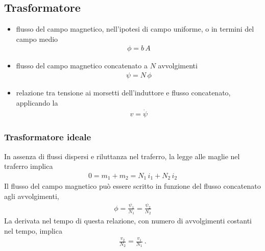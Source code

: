 \documentclass[letterpaper,10pt,english]{jupyterBook}
\begin{document}
\subsection{Trasformatore}
\label{\detokenize{ch/circuits-electromagnetic-transformer:trasformatore}}\label{\detokenize{ch/circuits-electromagnetic-transformer:classical-electromagnetism-circuits-electromagnetic-transformer}}\label{\detokenize{ch/circuits-electromagnetic-transformer::doc}}\begin{itemize}
\item {} 
\sphinxAtStartPar
flusso del campo magnetico, nell’ipotesi di campo uniforme, o in termini del campo medio
\begin{equation*}
\begin{split}\phi = b \, A\end{split}
\end{equation*}
\item {} 
\sphinxAtStartPar
flusso del campo magnetico concatenato a \(N\) avvolgimenti
\begin{equation*}
\begin{split}\psi = N \, \phi\end{split}
\end{equation*}
\item {} 
\sphinxAtStartPar
relazione tra tensione ai morsetti dell’induttore e flusso concatenato, applicando la {\hyperref[\detokenize{ch/circuits-electric-induction:classical-electromagnetism-circuits-electric-induction}]{}}
\begin{equation*}
\begin{split}v = \dot{\psi}\end{split}
\end{equation*}
\end{itemize}


\subsubsection{Trasformatore ideale}
\label{\detokenize{ch/circuits-electromagnetic-transformer:trasformatore-ideale}}
\sphinxAtStartPar
In assenza di flussi dispersi e riluttanza nel traferro, la legge alle maglie nel traferro implica
\begin{equation*}
\begin{split}0 = m_1 + m_2 = N_1 \, i_1 + N_2 \, i_2\end{split}
\end{equation*}
\sphinxAtStartPar
Il flusso del campo magnetico può essere scritto in funzione del flusso concatenato agli avvolgimenti,
\begin{equation*}
\begin{split}\phi = \frac{\psi_1}{N_1} = \frac{\psi_2}{N_2}\end{split}
\end{equation*}
\sphinxAtStartPar
La derivata nel tempo di questa relazione, con numero di avvolgimenti costanti nel tempo, implica
\begin{equation*}
\begin{split}\frac{v_2}{N_2} = \frac{v_1}{N_1} \ .\end{split}
\end{equation*}
\end{document}
